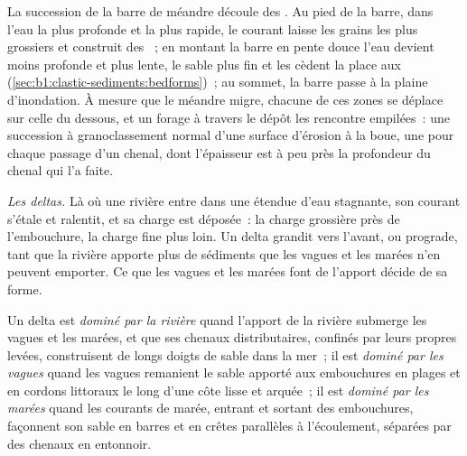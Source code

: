 La succession de la barre de méandre découle des . Au pied de la
barre, dans l'eau la plus profonde et la plus rapide, le courant laisse les grains les plus grossiers
et construit des ~; en montant la barre en pente douce l'eau devient moins profonde et plus
lente, le sable plus fin et les  cèdent la place aux 
(\cref{sec:b1:clastic-sediments:bedforms})~; au sommet, la barre passe à
la plaine d'inondation. À mesure que le méandre migre, chacune de ces zones se déplace sur celle
du dessous, et un forage à travers le dépôt les rencontre empilées~: une succession
à granoclassement normal d'une surface d'érosion à la boue, une pour chaque passage d'un chenal,
dont l'épaisseur est à peu près la profondeur du chenal qui l'a faite.

\emph{Les deltas.} Là où une rivière entre dans une étendue d'eau stagnante, son courant
s'étale et ralentit, et sa charge est déposée~: la charge grossière près de l'embouchure, la
charge fine plus loin. Un delta grandit vers l'avant, ou prograde, tant que la
rivière apporte plus de sédiments que les vagues et les marées n'en peuvent emporter. Ce que les
vagues et les marées font de l'apport décide de sa forme.

\begin{definition}\label{def:b1:clastic-sediments:delta}
Un delta est \emph{dominé par la rivière} quand l'apport de la rivière
submerge les vagues et les marées, et que ses chenaux distributaires, confinés par
leurs propres levées, construisent de longs doigts de sable dans la mer~; il est
\emph{dominé par les vagues} quand les vagues remanient le sable
apporté aux embouchures en plages et en cordons littoraux le long d'une côte lisse et
arquée~; il est \emph{dominé par les marées} quand les
courants de marée, entrant et sortant des embouchures, façonnent son sable en barres et en crêtes
parallèles à l'écoulement, séparées par des chenaux en entonnoir.
\end{definition}

